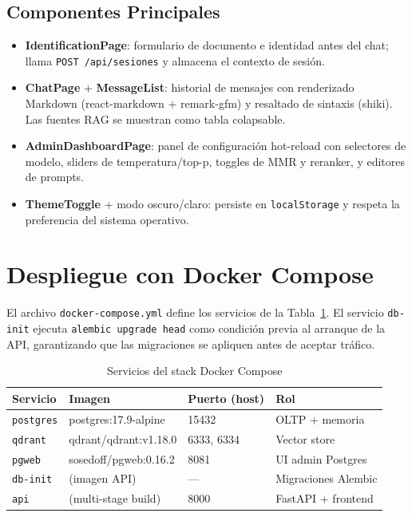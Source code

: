 \documentclass[conference]{IEEEtran}
\newcommand{\code}[1]{\texttt{\small #1}}
\begin{document}
\subsection{Componentes Principales}

\begin{itemize}
    \item \textbf{IdentificationPage}: formulario de documento e identidad antes
          del chat; llama \code{POST /api/sesiones} y almacena el contexto de
          sesión.
    \item \textbf{ChatPage} + \textbf{MessageList}: historial de mensajes con
          renderizado Markdown (react-markdown + remark-gfm) y resaltado de
          sintaxis (shiki). Las fuentes RAG se muestran como tabla colapsable.
    \item \textbf{AdminDashboardPage}: panel de configuración hot-reload con
          selectores de modelo, sliders de temperatura/top-p, toggles de MMR
          y reranker, y editores de prompts.
    \item \textbf{ThemeToggle} + modo oscuro/claro: persiste en
          \code{localStorage} y respeta la preferencia del sistema operativo.
\end{itemize}

\section{Despliegue con Docker Compose}
\label{sec:deploy}

El archivo \code{docker-compose.yml} define los servicios de la
Tabla~\ref{tab:docker}. El servicio \code{db-init} ejecuta
\code{alembic upgrade head} como condición previa al arranque de la API,
garantizando que las migraciones se apliquen antes de aceptar tráfico.

\begin{table}[ht]
\centering
\caption{Servicios del stack Docker Compose}
\label{tab:docker}
\setlength{\tabcolsep}{3pt}
\begin{tabular}{@{}llll@{}}
\toprule
\textbf{Servicio} & \textbf{Imagen} & \textbf{Puerto (host)} & \textbf{Rol} \\
\midrule
\code{postgres} & postgres:17.9-alpine   & 15432 & OLTP + memoria \\
\code{qdrant}   & qdrant/qdrant:v1.18.0  & 6333, 6334 & Vector store \\
\code{pgweb}    & sosedoff/pgweb:0.16.2  & 8081  & UI admin Postgres \\
\code{db-init}  & (imagen API)           & ---   & Migraciones Alembic \\
\code{api}      & (multi-stage build)    & 8000  & FastAPI + frontend \\
\bottomrule
\end{tabular}
\end{table}
\end{document}
